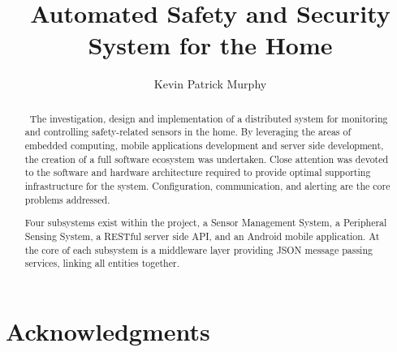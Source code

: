 \documentclass{article}
\begin{document}
\iffalse
\titlehead{\centering\texttt{[image: "header".jpg]}}
\fi

\title{Automated Safety and Security System for the Home}

\author{Kevin Patrick Murphy}

\maketitle

\begin{abstract}

{\ The investigation, design and implementation of a distributed system for monitoring and controlling safety-related sensors in the home. By leveraging the areas of embedded computing, mobile applications development and server side development, the creation of a full software ecosystem was undertaken. Close attention was devoted to the software and hardware architecture required to provide optimal supporting infrastructure for the system. Configuration, communication, and alerting are the core problems addressed.

Four subsystems exist within the project, a Sensor Management System, a Peripheral Sensing System, a RESTful server side API, and an Android mobile application. At the core of each subsystem is a middleware layer providing JSON message passing services, linking all entities together. }

\end{abstract}

\newpage

\tableofcontents

\newpage

\section*{Acknowledgments}
\end{document}
